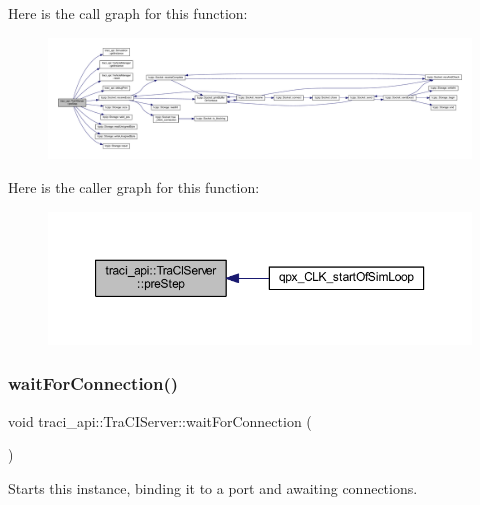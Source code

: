 Here is the call graph for this function\+:
\nopagebreak
\begin{figure}[H]
\begin{center}
\leavevmode
\includegraphics[width=350pt]{classtraci__api_1_1_tra_c_i_server_a8cd79e7da542e4abccc75d4933331d20_cgraph}
\end{center}
\end{figure}
Here is the caller graph for this function\+:
\nopagebreak
\begin{figure}[H]
\begin{center}
\leavevmode
\includegraphics[width=350pt]{classtraci__api_1_1_tra_c_i_server_a8cd79e7da542e4abccc75d4933331d20_icgraph}
\end{center}
\end{figure}
\mbox{\label{classtraci__api_1_1_tra_c_i_server_ac9cc474ec4ae6277c82cbf80f212852e}} 
\subsubsection{\texorpdfstring{wait\+For\+Connection()}{waitForConnection()}}
{\footnotesize\ttfamily void traci\+\_\+api\+::\+Tra\+C\+I\+Server\+::wait\+For\+Connection (\begin{DoxyParamCaption}{ }\end{DoxyParamCaption})}



Starts this instance, binding it to a port and awaiting connections. 

